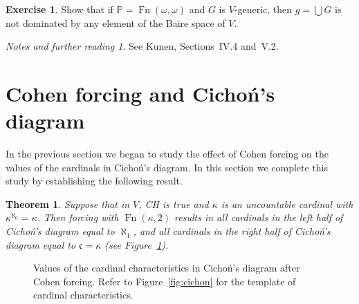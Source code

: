 \documentclass[11pt,oneside,a4paper]{amsbook}
\newcommand{\PP}{\mathbb P}
\DeclareMathOperator{\Fn}{Fn}
\theoremstyle{definition}
\newtheorem{exercise}{Exercise}[section]
\theoremstyle{plain}
\newtheorem{theorem}{Theorem}[section]
\theoremstyle{definition}
\theoremstyle{remark}
\newtheorem*{notes}{Notes and further reading}
\numberwithin{equation}{section}
\numberwithin{figure}{section}
\begin{document}
\begin{exercise}
  \label{exerc:cohen-nondom}
  Show that if $\PP=\Fn(\omega,\omega)$ and $G$ is $V$-generic, then $g=\bigcup G$ is not dominated by any element of the Baire space of $V$.
\end{exercise}

\begin{notes}
  See Kunen, Sections~IV.4 and~V.2.
\end{notes}

\newpage
\section{Cohen forcing and Cicho\'n's diagram}

In the previous section we began to study the effect of Cohen forcing on the values of the cardinals in Cicho\'n's diagram. In this section we complete this study by establishing the following result.

\begin{theorem}
  \label{thm:cohen-cichon}
  Suppose that in $V$, CH is true and $\kappa$ is an uncountable cardinal with $\kappa^{\aleph_0}=\kappa$. Then forcing with $\Fn(\kappa,2)$ results in all cardinals in the left half of Cicho\'n's diagram equal to $\aleph_1$, and all cardinals in the right half of Cicho\'n's diagram equal to $\mathfrak c=\kappa$ (see Figure~\ref{fig:cichon-cohen}).
\end{theorem}


\begin{figure}[h]
  \caption{Values of the cardinal characteristics in Cicho\'n's diagram after Cohen forcing. Refer to Figure~\ref{fig:cichon} for the template of cardinal characteristics.\label{fig:cichon-cohen}}
\end{figure}
\end{document}
